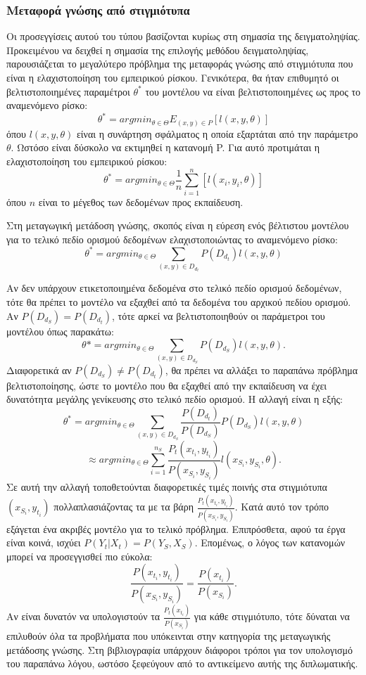 \subsubsection{Μεταφορά γνώσης από στιγμιότυπα}
Οι προσεγγίσεις αυτού του τύπου βασίζονται κυρίως στη σημασία της δειγματοληψίας. Προκειμένου να δειχθεί η σημασία της επιλογής μεθόδου δειγματοληψίας, παρουσιάζεται το μεγαλύτερο πρόβλημα της μεταφοράς γνώσης από στιγμιότυπα που είναι η ελαχιστοποίηση του εμπειρικού ρίσκου. Γενικότερα, θα ήταν επιθυμητό οι βελτιστοποιημένες παραμέτροι $\theta^*$ του μοντέλου να είναι βελτιστοποιημένες ως προς το αναμενόμενο ρίσκο: 
$$
\theta^* = argmin_{\theta \in \Theta} E_{(x,y) \in P} \left[ l(x, y, \theta)\right]
$$
όπου $l(x, y, \theta)$ είναι η συνάρτηση σφάλματος η οποία εξαρτάται από την παράμετρο $\theta$. Ωστόσο είναι δύσκολο να εκτιμηθεί η κατανομή P. Για αυτό προτιμάται η ελαχιστοποίηση του εμπειρικού ρίσκου:
$$
\theta^* = argmin_{\theta \in \Theta} \frac{1}{n}\sum_{i=1}^{n} \left[ l(x_i, y_i, \theta)\right]
$$
όπου $n$ είναι το μέγεθος των δεδομένων προς εκπαίδευση.

Στη μεταγωγική μετάδοση γνώσης, σκοπός είναι η εύρεση ενός βέλτιστου μοντέλου για το τελικό πεδίο ορισμού δεδομένων ελαχιστοποιώντας το αναμενόμενο ρίσκο:
$$
\theta^* = argmin_{\theta \in \Theta} \sum_{(x,y) \in D_{d_t}} P\left(D_{d_t}\right) l(x, y, \theta)
$$

Αν δεν υπάρχουν ετικετοποιημένα δεδομένα στο τελικό πεδίο ορισμού δεδομένων, τότε θα πρέπει το μοντέλο να εξαχθεί από τα δεδομένα του αρχικού πεδίου ορισμού. Αν $ P(D_{d_S}) = P(D_{d_t}) $, τότε αρκεί να βελτιστοποιηθούν οι παράμετροι του μοντέλου όπως παρακάτω:
$$
\theta* = argmin_{\theta \in \Theta} \sum_{(x,y) \in D_{d_S}} P\left(D_{d_S}\right) l(x, y, \theta).
$$
Διαφορετικά αν $ P(D_{d_S}) \neq P(D_{d_t})$, θα πρέπει να αλλάξει το παραπάνω πρόβλημα βελτιστοποίησης, ώστε το μοντέλο που θα εξαχθεί από την εκπαίδευση να έχει δυνατότητα μεγάλης γενίκευσης στο τελικό πεδίο ορισμού. Η αλλαγή είναι η εξής:
$$
\theta^* = argmin_{\theta \in \Theta} \sum_{(x,y) \in D_{d_S}} \frac{P\left(D_{d_t}\right)}{P\left(D_{d_S}\right)} P\left(D_{d_S}\right) l(x, y, \theta)
$$
$$
	\approx argmin_{\theta \in \Theta} \sum_{i=1}^{n_S} \frac{P_t\left(x_{t_i}, y_{t_i}\right)}{P\left(x_{S_i}, y_{S_i}\right)}  l(x_{S_i}, y_{S_i}, \theta).
$$
Σε αυτή την αλλαγή τοποθετούνται διαφορετικές τιμές ποινής στα στιγμιότυπα $(x_{S_i}, y_{t_i})$ πολλαπλασιάζοντας τα με τα βάρη $\frac{P_t\left(x_{t_i}, y_{t_i}\right)}{P\left(x_{S_i}, y_{S_i}\right)}$. Κατά αυτό τον τρόπο εξάγεται ένα ακριβές μοντέλο για το τελικό πρόβλημα. Επιπρόσθετα, αφού τα έργα είναι κοινά, ισχύει $P\left( Y_t | X_t\right) = P\left(Y_S, X_S\right)$. Επομένως, ο λόγος των κατανομών μπορεί να προσεγγισθεί πιο εύκολα:
$$
 \frac{P\left(x_{t_i}, y_{t_i}\right)}{P\left(x_{S_i}, y_{S_i}\right)} =  \frac{P\left(x_{t_i}\right)}{P\left(x_{S_i}\right)}.
$$
Αν είναι δυνατόν να υπολογιστούν τα $\frac{P_t\left(x_{t_i}\right)}{P\left(x_{S_i}\right)}$ για κάθε στιγμιότυπο, τότε δύναται να επιλυθούν όλα τα προβλήματα που υπόκεινται στην κατηγορία της μεταγωγικής μετάδοσης γνώσης. Στη βιβλιογραφία υπάρχουν διάφοροι τρόποι για τον υπολογισμό του παραπάνω λόγου, ωστόσο ξεφεύγουν από το αντικείμενο αυτής της διπλωματικής.


